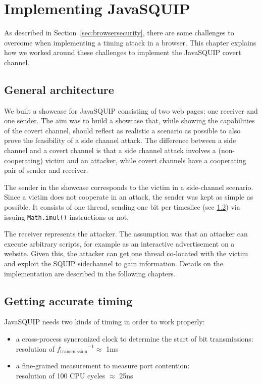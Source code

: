 \documentclass[11pt,
  titlepage=false,
]{scrreprt}
\begin{document}
\chapter{Implementing JavaSQUIP}
\label{ch:implementation}
As described in Section~\ref{sec:browsersecurity}, there are some challenges to overcome when implementing a timing attack in a browser.
This chapter explains how we worked around these challenges to implement the JavaSQUIP covert channel.

\section{General architecture}
We built a showcase for JavaSQUIP consisting of two web pages: one receiver and one sender.
The aim was to build a showcase that, while showing the capabilities of the covert channel,
should reflect as realistic a scenario as possible to also prove the feasibility of a side channel attack.
The difference between a side channel and a covert channel is that a side channel attack involves a (non-cooperating) victim and
an attacker, while covert channels have a cooperating pair of sender and receiver.

The sender in the showcase corresponds to the victim in a side-channel scenario.
Since a victim does not cooperate in an attack, the sender was kept as simple as possible.
It consists of one thread, sending one bit per timeslice (see \ref{sec:accurate-timing}) via issuing \texttt{Math.imul()} instructions or not.

The receiver represents the attacker.
The assumption was that an attacker can execute arbitrary scripts, for example as an interactive advertisement on a website.
Given this, the attacker can get one thread co-located with the victim and exploit the SQUIP sidechannel to gain information.
Details on the implementation are described in the following chapters.

\section{Getting accurate timing}
\label{sec:accurate-timing}
JavaSQUIP needs two kinds of timing in order to work properly:
\begin{itemize}
    \item a cross-process syncronized clock to determine the start of bit transmissions:\\
    resolution of ${f_{\text{transmission}}}^{-1} \approx$ 1ms
    \item a fine-grained measurement to measure port contention:\\
    resolution of 100 CPU cycles $\approx$ 25ns
\end{itemize}
\end{document}
